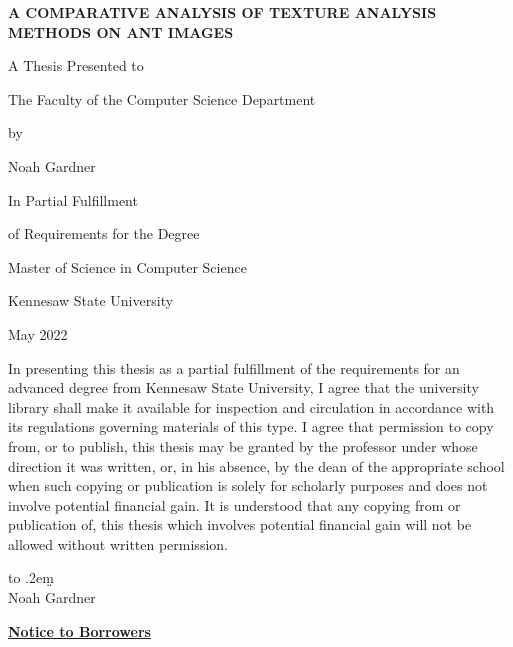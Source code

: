 \documentclass[12pt]{article}
\newcommand{\thesistitle}{
    {\Large A comparative analysis of texture analysis methods on
ant images}
}
\newcommand{\toppage}{\vspace*{0.3in}}
\begin{document}
\toppage
\begin{center}
    \textbf{\MakeUppercase{\thesistitle}}
    \vspace{1in}

    A Thesis Presented to

    The Faculty of the Computer Science Department
    \vspace{1in}

    by
    \vspace{0.5in}

    Noah Gardner
    \vspace{1in}

    In Partial Fulfillment

    of Requirements for the Degree

    Master of Science in Computer Science

    \vspace{1in}
    Kennesaw State University

    May 2022
\end{center}
\thispagestyle{empty}
\newpage

\toppage
\noindent In presenting this thesis as a partial fulfillment of the requirements
for an advanced degree from Kennesaw State University, I agree that the
university library shall make it available for inspection and circulation in
accordance with its regulations governing materials of this type. I agree that
permission to copy from, or to publish, this thesis may be granted by the
professor under whose direction it was written, or, in his absence, by the dean
of the appropriate school when such copying or publication is solely for
scholarly purposes and does not involve potential financial gain. It is
understood that any copying from or publication of, this thesis which involves
potential financial gain will not be allowed without written permission.
\vspace{2in}

\def\dotsign{\xleaders\hbox to .2em{\d{}}\hfill\d{}}
\begin{center}
    \makebox[.5\linewidth][r]\dotsign\smallskip\\
    Noah Gardner
\end{center}
\newpage

\toppage
\begin{center}
    \textbf{\underline{Notice to Borrowers}}
\end{center}
\vspace{0.5in}
\end{document}
